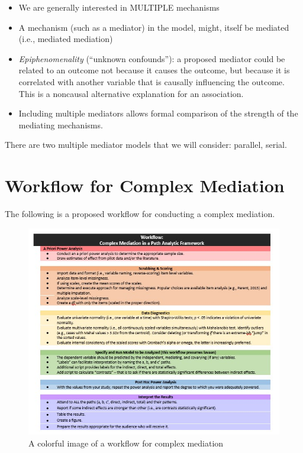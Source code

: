 \documentclass[
  11pt,
]{book}
\providecommand{\tightlist}{%
  \setlength{\itemsep}{0pt}\setlength{\parskip}{0pt}}
\begin{document}
\begin{itemize}
\tightlist
\item
  We are generally interested in MULTIPLE mechanisms
\item
  A mechanism (such as a mediator) in the model, might, itself be mediated (i.e., mediated mediation)
\item
  \emph{Epiphenomenality} (``unknown confounds''): a proposed mediator could be related to an outcome not because it causes the outcome, but because it is correlated with another variable that is causally influencing the outcome. This is a noncausal alternative explanation for an association.
\item
  Including multiple mediators allows formal comparison of the strength of the mediating mechanisms.
\end{itemize}

There are two multiple mediator models that we will consider: parallel, serial.

\hypertarget{workflow-for-complex-mediation}{%
\section{Workflow for Complex Mediation}\label{workflow-for-complex-mediation}}

The following is a proposed workflow for conducting a complex mediation.

\begin{figure}
\centering
\includegraphics{images/CompMed/CompMedWorkflow.jpg}
\caption{A colorful image of a workflow for complex mediation}
\end{figure}
\end{document}

